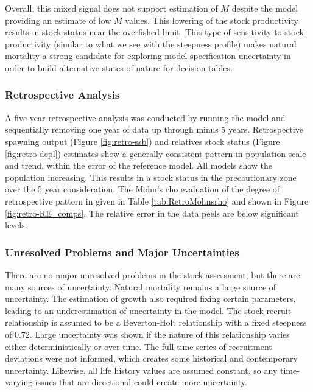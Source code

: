 \documentclass[11pt,
  letterpaper,
]{article}
\begin{document}
Overall, this mixed signal does not support estimation of \(M\) despite the model providing an estimate of low \(M\) values. This lowering of the stock productivity results in stock status near the overfished limit. This type of sensitivity to stock productivity (similar to what we see with the steepness profile) makes natural mortality a strong candidate for exploring model specification uncertainty in order to build alternative states of nature for decision tables.

\hypertarget{retrospective-analysis}{%
\subsubsection{Retrospective Analysis}\label{retrospective-analysis}}

A five-year retrospective analysis was conducted by running the model and sequentially removing one year of data up through minus 5 years. Retrospective spawning output (Figure \ref{fig:retro-ssb}) and relatives stock status (Figure \ref{fig:retro-depl}) estimates show a generally consistent pattern in population scale and trend, within the error of the reference model. All models show the population increasing. This results in a stock status in the precautionary zone over the 5 year consideration. The Mohn's rho evaluation of the degree of retrospective pattern in given in Table \ref{tab:RetroMohnsrho} and shown in Figure \ref{fig:retro-RE_comps}. The relative error in the data peels are below significant levels.

\hypertarget{unresolved-problems-and-major-uncertainties-1}{%
\subsubsection{Unresolved Problems and Major Uncertainties}\label{unresolved-problems-and-major-uncertainties-1}}

There are no major unresolved problems in the stock assessment, but there are many sources of uncertainty. Natural mortality remains a large source of uncertainty. The estimation of growth also required fixing certain parameters, leading to an underestimation of uncertainty in the model. The stock-recruit relationship is assumed to be a Beverton-Holt relationship with a fixed steepness of 0.72. Large uncertainty was shown if the nature of this relationship varies either deterministically or over time. The full time series of recruitment deviations were not informed, which creates some historical and contemporary uncertainty. Likewise, all life history values are assumed constant, so any time-varying issues that are directional could create more uncertainty.
\end{document}

